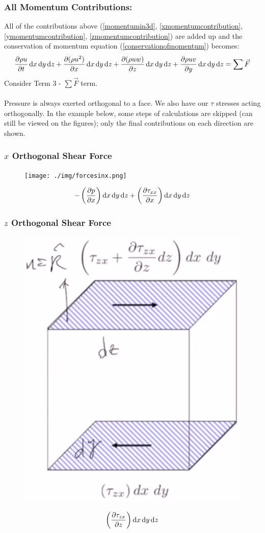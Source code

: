\subsubsection{All Momentum Contributions:}
All of the contributions above (\ref{momentumin3d}, \ref{xmomentumcontribution}, \ref{ymomentumcontribution}, \ref{zmomentumcontribution}) are added up and the conservation of momentum equation (\ref{conservationofmomentum}) becomes:
\begin{equation}
  \frac{\partial \rho u}{\partial t}\dif x \dif y \dif z + \frac{\partial(\rho u^2)}{\partial x} \dif x \dif y \dif z + \frac{\partial (\rho u w)}{\partial z} \dif x \dif y \dif z + \frac{\partial \rho u v}{\partial y} \dif x \dif y \dif z = \sum \vec{F}
\end{equation}
Consider Term 3 - $\sum \vec{F}$ term. \\\\
Pressure is always exerted orthogonal to a face. We also have our $\tau$ stresses acting orthogonally. In the example below, some steps of calculations are skipped (can still be viewed on the figures); only the final contributions on each direction are shown.
\subsubsection{$x$ Orthogonal Shear Force}
\begin{figure}[H]
  \centering
  \texttt{[image: ./img/forcesinx.png]}
\end{figure}
\begin{equation}
  - \left( \frac{\partial p}{\partial x} \right) \dif x \dif y \dif z + \left( \frac{\partial \tau_{xx}}{\partial x} \right) \dif x \dif y \dif z
\end{equation}
\subsubsection{$z$ Orthogonal Shear Force}
\begin{figure}[H]
  \centering
  \includegraphics[width = 0.3 \textwidth]{./img/forceinxz.png}
\end{figure}
\begin{equation}
  \left( \frac{\partial \tau_{zx}}{\partial z} \right) \dif x \dif y \dif z
\end{equation}
